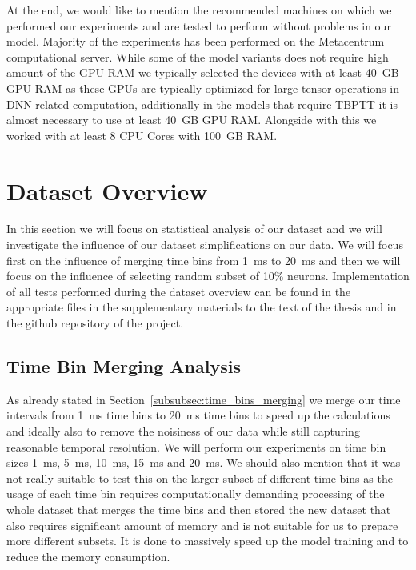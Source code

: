 At the end, we would like to mention the recommended machines on which we performed our experiments and are tested to perform without problems in our model. Majority of the experiments has been performed on the Metacentrum computational server. While some of the model variants does not require high amount of the GPU RAM we typically selected the devices with at least 40~GB GPU RAM as these GPUs are typically optimized for large tensor operations in DNN related computation, additionally in the models that require TBPTT it is almost necessary to use at least 40~GB GPU RAM. Alongside with this we worked with at least 8 CPU Cores with 100~GB RAM.

\section{Dataset Overview}
\label{sec:dataset_overview}

In this section we will focus on statistical analysis of our dataset and we will investigate the influence of our dataset simplifications on our data. We will focus first on the influence of merging time bins from 1~ms to 20~ms and then we will focus on the influence of selecting random subset of 10\% neurons. Implementation of all tests performed during the dataset overview can be found in the appropriate files in the supplementary materials to the text of the thesis and in the github repository of the project.

\subsection{Time Bin Merging Analysis}
\label{subsec:time_bin_merging_analysis}
As already stated in Section~\ref{subsubsec:time_bins_merging} we merge our time intervals from 1~ms time bins to 20~ms time bins to speed up the calculations and ideally also to remove the noisiness of our data while still capturing reasonable temporal resolution. We will perform our experiments on time bin sizes 1~ms, 5~ms, 10~ms, 15~ms and 20~ms. We should also mention that it was not really suitable to test this on the larger subset of different time bins as the usage of each time bin requires computationally demanding processing of the whole dataset that merges the time bins and then stored the new dataset that also requires significant amount of memory and is not suitable for us to prepare more different subsets. It is done to massively speed up the model training and to reduce the memory consumption. 

